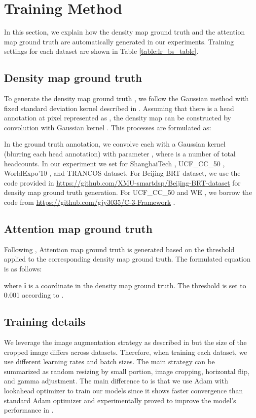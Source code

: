 \documentclass[10pt, conference, a4paper]{IEEEtran}
\begin{document}
\section{Training Method}
In this section, we explain how the density map ground truth and the attention map ground truth are automatically generated in our experiments. Training settings for each dataset are shown in Table \ref{table:lr_bs_table}.
\label{training_method_section}

\subsection{Density map ground truth}
To generate the density map ground truth , we follow the Gaussian method with fixed standard deviation kernel described in \cite{zhang2016single}. Assuming that there is a head annotation at pixel  represented as , the density map can be constructed by convolution with Gaussian kernel \cite{lempitsky2010learning}. This processes are formulated as:
 
In the ground truth annotation, we convolve each  with a Gaussian kernel (blurring each head annotation) with parameter , where  is a number of total headcounts. In our experiment we set  for ShanghaiTech \cite{zhang2016single}, UCF\_CC\_50 \cite{bansal2015people}, WorldExpo'10 \cite{zhang2015cross}, and TRANCOS \cite{guerrero2015extremely} dataset. For Beijing BRT \cite{ding2018deeply} dataset, we use the code provided in \url{https://github.com/XMU-smartdsp/Beijing-BRT-dataset} for density map ground truth generation. For UCF\_CC\_50 \cite{bansal2015people} and WE \cite{zhang2015cross}, we borrow the code from \url{https://github.com/gjy3035/C-3-Framework} \cite{gao2019c}.

\subsection{Attention map ground truth}
Following \cite{zhu2019dual}, Attention map ground truth is generated based on the threshold applied to the corresponding density map ground truth. The formulated equation is as follows: 


where \textbf{i} is a coordinate in the density map ground truth. The threshold is set to 0.001 according to \cite{zhu2019dual}.

\subsection{Training details}
We leverage the image augmentation strategy as described in \cite{zhu2019dual} but the size of the cropped image differs across datasets. Therefore, when training each dataset, we use different learning rates and batch sizes. The main strategy can be summarized as random resizing by small portion, image cropping, horizontal flip, and gamma adjustment. The main difference to \cite{zhu2019dual} is that we use Adam \cite{kingma2014adam} with lookahead optimizer \cite{zhang2019lookahead} to train our models since it shows faster convergence than standard Adam optimizer and experimentally proved to improve the model's performance in \cite{zhang2019lookahead}.
\end{document}
